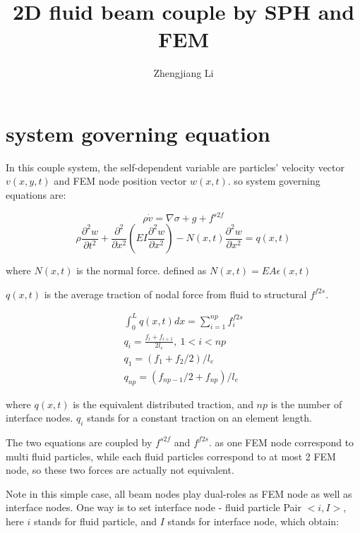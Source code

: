 \documentclass[11pt]{article}
\begin{document}
\title{2D fluid beam couple by SPH and FEM}

\author{Zhengjiang Li}

\date{}

\maketitle



\section {system governing equation}

In this couple system, the self-dependent variable are particles' velocity vector $v(x,y,t)$ and FEM node position vector $w(x,t)$. so system governing equations are:

   $$	\rho  \dot{v} = \nabla \sigma + g + f^{s2f} $$ 
$$ \rho \frac{\partial^2 w}{\partial t^2} + \frac{\partial^2}{\partial x^2}( EI \frac{\partial^2 w}{\partial x^2}) - N(x,t) \frac{\partial^2 w}{\partial x^2} = q(x,t) $$

where $N(x,t)$ is the normal force. defined as $ N(x,t) = EA \epsilon(x,t) $

$q(x,t)$ is the average traction of nodal force from fluid to structural $f^{f2s}$. 

\begin{subequations}
\begin{align}
 \int_0^L q(x,t) dx = \sum_{i=1}^{np} f^{f2s}_i \\
q_i = \frac{f_i + f_{i+1}}{2l_e}, \  1< i < np \\
q_1 = (f_1 + f_2/2)/ l_e \\
q_{np} = (f_{np-1}/2 + f_{np})/l_e 
\end{align}
\end{subequations}

where $ q(x,t)$ is the equivalent distributed traction, and $np$ is the number of interface nodes. $q_i$ stands for a constant traction on an element length. 


The two equations are coupled by $f^{s2f}$ and $f^{f2s}$. as one FEM node correspond to multi fluid particles, while each fluid particles correspond to at most 2 FEM node, so these two forces are actually not equivalent.


Note in this simple case, all beam nodes play dual-roles as FEM node as well as interface nodes. One way is to set interface node - fluid particle Pair $<i, I>$, here $i$ stands for fluid particle, and $I$ stands for interface node, which obtain:
\end{document}
